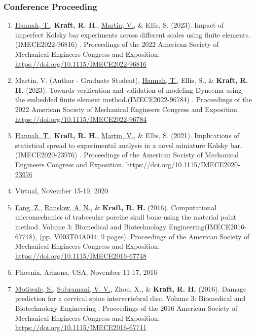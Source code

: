 \documentclass[a4paper,10pt]{article}
\begin{document}
\subsubsection{Conference Proceeding}\label{conference-proceeding}

\begin{enumerate}
\def\labelenumi{\arabic{enumi}.}
  \item \underline{Hannah, T.}, \textbf{\textbf{Kraft,} R. H.}, \underline{Martin, V.}, \&
 Ellis, S. (2023). Impact of imperfect Kolsky bar experiments across different scales using finite elements.(IMECE2022-96816) . Proceedings of the 2022 American Society of Mechanical Engineers Congress and Exposition. \url{https://doi.org/10.1115/IMECE2022-96816}
  \item Martin, V. (Author - Graduate Student), \underline{Hannah, T.}, Ellis, S., \&
 \textbf{\textbf{Kraft,} R. H.} (2023). Towards verification and validation of modeling Dyneema using the embedded finite element method.(IMECE2022-96784) . Proceedings of the 2022 American Society of Mechanical Engineers Congress and Exposition. \url{https://doi.org/10.1115/IMECE2022-96784}
  \item \underline{Hannah, T.}, \textbf{\textbf{Kraft,} R. H.}, \underline{Martin, V.}, \&
 Ellis, S. (2021). Implications of statistical spread to experimental analysis in a novel miniature Kolsky bar.(IMECE2020-23976) . Proceedings of the American Society of Mechanical Engineers Congress and Exposition. \url{https://doi.org/10.1115/IMECE2020-23976}
  \item Virtual, November 15-19, 2020
  \item \underline{Fang, Z.}, \underline{Ranslow, A. N.}, \&
 \textbf{\textbf{Kraft,} R. H.} (2016). Computational micromechanics of trabecular porcine skull bone using the material point method. Volume 3: Biomedical and Biotechnology Engineering(IMECE2016-67748), (pp. V003T04A044; 9 pages). Proceedings of the American Society of Mechanical Engineers Congress and Exposition. \url{https://doi.org/10.1115/IMECE2016-67748}
  \item Phoenix, Arizona, USA, November 11-17, 2016
  \item \underline{Motiwale, S.}, \underline{Subramani, V. V.}, Zhou, X., \&
 \textbf{\textbf{Kraft,} R. H.} (2016). Damage prediction for a cervical spine intervertebral disc. Volume 3: Biomedical and Biotechnology Engineering . Proceedings of the 2016 American Society of Mechanical Engineers Congress and Exposition. \url{https://doi.org/10.1115/IMECE2016-67711}

\end{enumerate}
\end{document}
